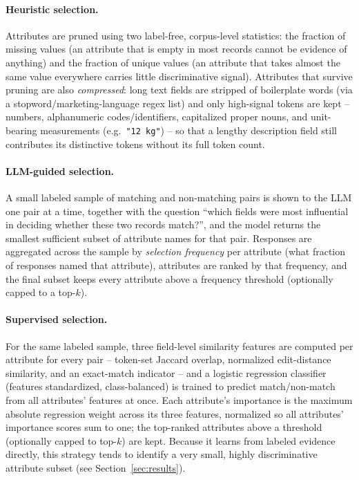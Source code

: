 \documentclass[11pt]{article}
\begin{document}
\paragraph{Heuristic selection.} Attributes are pruned using two label-free,
corpus-level statistics: the fraction of missing values (an attribute that is empty
in most records cannot be evidence of anything) and the fraction of unique values
(an attribute that takes almost the same value everywhere carries little
discriminative signal). Attributes that survive pruning are also \emph{compressed}:
long text fields are stripped of boilerplate words (via a stopword/marketing-language
regex list) and only high-signal tokens are kept -- numbers, alphanumeric
codes/identifiers, capitalized proper nouns, and unit-bearing measurements (e.g.\
\texttt{"12 kg"}) -- so that a lengthy description field still contributes its
distinctive tokens without its full token count.

\paragraph{LLM-guided selection.} A small labeled sample of matching and
non-matching pairs is shown to the LLM one pair at a time, together with the
question ``which fields were most influential in deciding whether these two records
match?'', and the model returns the smallest sufficient subset of attribute names for
that pair. Responses are aggregated across the sample by \emph{selection frequency}
per attribute (what fraction of responses named that attribute), attributes are
ranked by that frequency, and the final subset keeps every attribute above a
frequency threshold (optionally capped to a top-$k$).

\paragraph{Supervised selection.} For the same labeled sample, three field-level
similarity features are computed per attribute for every pair -- token-set Jaccard
overlap, normalized edit-distance similarity, and an exact-match indicator -- and a
logistic regression classifier (features standardized, class-balanced) is trained to
predict match/non-match from all attributes' features at once. Each attribute's
importance is the maximum absolute regression weight across its three features,
normalized so all attributes' importance scores sum to one; the top-ranked
attributes above a threshold (optionally capped to top-$k$) are kept. Because it
learns from labeled evidence directly, this strategy tends to identify a very small,
highly discriminative attribute subset (see Section~\ref{sec:results}).
\end{document}
